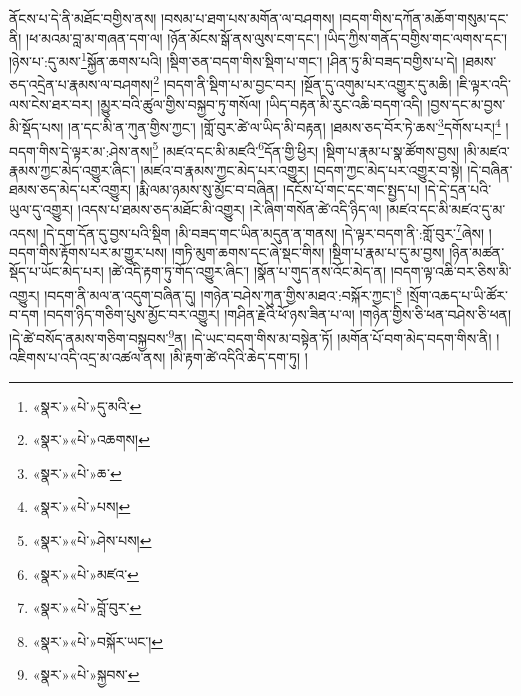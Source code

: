 ནོངས་པ་དེ་ནི་མཐོང་བགྱིས་ནས། །བསམ་པ་ཐག་པས་མགོན་ལ་བཤགས། །བདག་གིས་དཀོན་མཆོག་གསུམ་དང་ནི། །ཕ་མའམ་བླ་མ་གཞན་དག་ལ། །ཉོན་མོངས་སྒོ་ནས་ལུས་ངག་དང་། །ཡིད་ཀྱིས་གནོད་བགྱིས་གང་ལགས་དང་། །ཉེས་པ་:དུ་མས་\footnote{«སྣར་»«པེ་»དུ་མའི་}སྐྱོན་ཆགས་པའི། །སྡིག་ཅན་བདག་གིས་སྡིག་པ་གང་། །ཤིན་ཏུ་མི་བཟད་བགྱིས་པ་དེ། །ཐམས་ཅད་འདྲེན་པ་རྣམས་ལ་བཤགས།\footnote{«སྣར་»«པེ་»འཆགས།} །བདག་ནི་སྡིག་པ་མ་བྱང་བར། །སྔོན་དུ་འགུམ་པར་འགྱུར་དུ་མཆི། །ཇི་ལྟར་འདི་ལས་ངེས་ཐར་བར། །མྱུར་བའི་ཚུལ་གྱིས་བསྐྱབ་ཏུ་གསོལ། །ཡིད་བརྟན་མི་རུང་འཆི་བདག་འདི། །བྱས་དང་མ་བྱས་མི་སྡོད་པས། །ན་དང་མི་ན་ཀུན་གྱིས་ཀྱང་། །གློ་བུར་ཚེ་ལ་ཡིད་མི་བརྟན། །ཐམས་ཅད་བོར་ཏེ་ཆས་\footnote{«སྣར་»«པེ་»ཆ་}དགོས་པར།\footnote{«སྣར་»«པེ་»པས།} །བདག་གིས་དེ་ལྟར་མ་:ཤེས་ནས།\footnote{«སྣར་»«པེ་»ཤེས་པས།} །མཛའ་དང་མི་མཛའི་\footnote{«སྣར་»«པེ་»མཛའ་}དོན་གྱི་ཕྱིར། །སྡིག་པ་རྣམ་པ་སྣ་ཚོགས་བྱས། །མི་མཛའ་རྣམས་ཀྱང་མེད་འགྱུར་ཞིང་། །མཛའ་བ་རྣམས་ཀྱང་མེད་པར་འགྱུར། །བདག་ཀྱང་མེད་པར་འགྱུར་བ་སྟེ། །དེ་བཞིན་ཐམས་ཅད་མེད་པར་འགྱུར། །རྨི་ལམ་ཉམས་སུ་མྱོང་བ་བཞིན། །དངོས་པོ་གང་དང་གང་སྤྱད་པ། །དེ་དེ་དྲན་པའི་ཡུལ་དུ་འགྱུར། །འདས་པ་ཐམས་ཅད་མཐོང་མི་འགྱུར། །རེ་ཞིག་གསོན་ཚེ་འདི་ཉིད་ལ། །མཛའ་དང་མི་མཛའ་དུ་མ་འདས། །དེ་དག་དོན་དུ་བྱས་པའི་སྡིག །མི་བཟད་གང་ཡིན་མདུན་ན་གནས། །དེ་ལྟར་བདག་ནི་:གློ་བུར་\footnote{«སྣར་»«པེ་»བློ་བུར་}ཞེས། །བདག་གིས་རྟོགས་པར་མ་གྱུར་པས། །གཏི་མུག་ཆགས་དང་ཞེ་སྡང་གིས། །སྡིག་པ་རྣམ་པ་དུ་མ་བྱས། །ཉིན་མཚན་སྡོད་པ་ཡོང་མེད་པར། །ཚེ་འདི་རྟག་ཏུ་གོད་འགྱུར་ཞིང་། །སྣོན་པ་གུད་ནས་འོང་མེད་ན། །བདག་ལྟ་འཆི་བར་ཅིས་མི་འགྱུར། །བདག་ནི་མལ་ན་འདུག་བཞིན་དུ། །གཉེན་བཤེས་ཀུན་གྱིས་མཐའ་:བསྐོར་ཀྱང་།\footnote{«སྣར་»«པེ་»བསྐོར་ཡང་།} །སྲོག་འཆད་པ་ཡི་ཚོར་བ་དག །བདག་ཉིད་གཅིག་པུས་མྱོང་བར་འགྱུར། །གཤིན་རྗེའི་ཕོ་ཉས་ཟིན་པ་ལ། །གཉེན་གྱིས་ཅི་ཕན་བཤེས་ཅི་ཕན། །དེ་ཚེ་བསོད་ནམས་གཅིག་བསྐྱབས་\footnote{«སྣར་»«པེ་»སྐྱབས་}ན། །དེ་ཡང་བདག་གིས་མ་བསྟེན་ཏོ། །མགོན་པོ་བག་མེད་བདག་གིས་ནི། །འཇིགས་པ་འདི་འདྲ་མ་འཚལ་ནས། །མི་རྟག་ཚེ་འདིའི་ཆེད་དག་ཏུ། །
